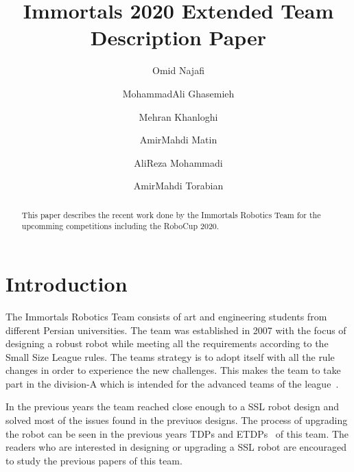\documentclass[runningheads]{llncs}
\begin{document}
%
\title{Immortals 2020 Extended Team Description Paper}
%
%
\author{Omid Najafi \and
MohammadAli Ghasemieh \and
Mehran Khanloghi \and
AmirMahdi Matin \and
AliReza Mohammadi \and
AmirMahdi Torabian}
%
%
%
\maketitle              %
%
\begin{abstract}
This paper describes the recent work done by the Immortals Robotics Team for the upcomming competitions including the RoboCup 2020.

\end{abstract}
%
%
%
\section{Introduction}
The Immortals Robotics Team consists of art and engineering students from different Persian universities.
The team was established in 2007 with the focus of designing a robust robot while meeting all the requirements according to the Small Size League rules. The teams strategy is to adopt itself with all the rule changes in order to experience the new challenges. This makes the team to take part in the division-A which is intended for the advanced teams of the league~\cite{ref_website}.

In the previous years the team reached close enough to a SSL robot design and solved most of the issues found in the previuos designs. The process of upgrading the robot can be seen in the previous years TDPs and ETDPs~\cite{ref_ETDP2019} of this team. The readers who are interested in designing or upgrading a SSL robot are encouraged to study the previous papers of this team.
\end{document}
